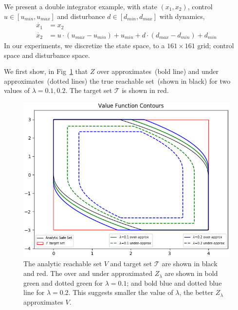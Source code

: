 We present a double integrator example, with state $(x_1, x_2)$, control $u \in [u_{min}, u_{max}]$ and disturbance $d \in [d_{min}, d_{max}]$ with dynamics,
\begin{equation}
\begin{split}
\dot{x_1} & = x_2 \\
\dot{x_2} & = u \cdot(u_{max}-u_{min}) + u_{min} + d \cdot (d_{max}-d_{min}) + d_{min}
\end{split}
\end{equation}
In our experiments, we discretize the state space, to a $161 \times 161$ grid; control space and disturbance space. 

We first show, in Fig~\ref{fig:convergence} that $Z$ over approximates~(bold line) and under approximates~(dotted lines) the true reachable set~(shown in black) for two values of $\lambda = 0.1, 0.2$. The target set $\mathcal{T}$ is shown in red. 
\begin{figure}
\includegraphics[scale=0.5]{convergence_difflambda.png}
\caption{The analytic reachable set $V$ and target set $\mathcal{T}$ are shown in black and red. The over and under approximated $Z_{\lambda}$ are shown in bold green and dotted green for $\lambda=0.1$; and bold blue and dotted blue line for $\lambda  = 0.2$. This suggests smaller the value of $\lambda$, the better $Z_{\lambda}$ approximates $V$.}
\label{fig:convergence}
\end{figure}

